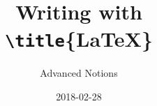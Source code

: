 \documentclass[aspectratio=1610,compress,t,gabaritb,english,french]{hecppt}
\title{Writing with \\ \texttt{\textbackslash title}\{\textrm{\LaTeX}\} }
\subtitle{Advanced Notions}
\date[2018-02-28]{2018-02-28}
\begin{document}
\pageTitre






\end{document}
